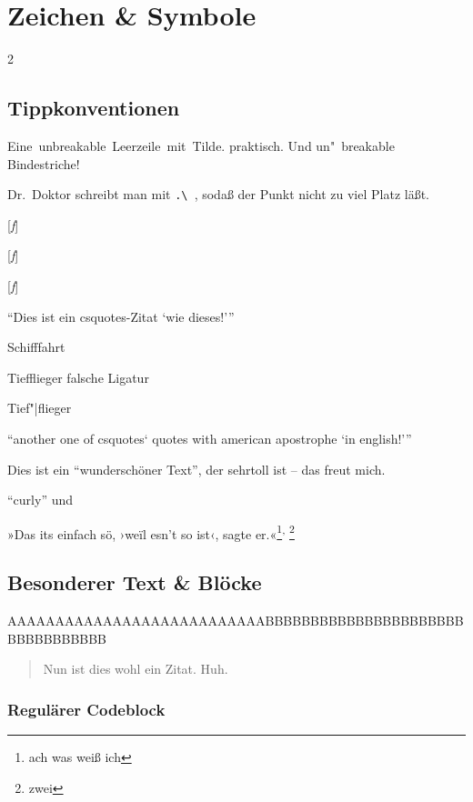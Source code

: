 \section{Zeichen \& Symbole}

\begin{multicols}{2}

\subsection{Tippkonventionen}

Eine~unbreakable~Leerzeile~mit~Tilde. praktisch.
Und un"~breakable Bindestriche!

Dr.\ Doktor schreibt man mit \verb`.\ `, sodaß der Punkt nicht zu viel Platz läßt.

[{\itshape f}]

[{\itshape f\/}]

[\textit{f}]

\enquote{Dies ist ein csquotes-Zitat \enquote{wie dieses!}}

Schifffahrt

Tiefflieger falsche Ligatur

Tief"|flieger

\foreignlanguage{english}{\enquote{another one of csquotes` quotes with american apostrophe \enquote{in english!}}}

Dies ist ein "`wunderschöner Text"', der \glq sehr\grq toll ist -- das freut mich.

``curly'' und \flqq

»Das its einfach s\"o, ›we\"il esn't so ist‹, sagte er.«\footnote{ach was weiß ich}\textsuperscript{,} \footnote{zwei}

\subsection{Besonderer Text \& Blöcke}

AAAAAAAAAAAAAAAAAAAAAAAAAAA\-BBBBBBBBBBBBBBBBBBBBBBBBBBBBBBBBB

\lipsum[1]

\begin{quote}
Nun ist dies wohl ein Zitat. Huh. \blindtext
\end{quote}

\subsubsection{Regulärer Codeblock}


\end{multicols}

